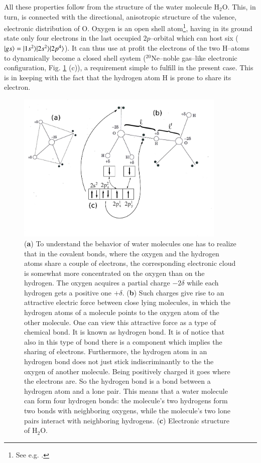 \begin{subappendices}
All these properties follow from the structure of the water molecule H$_2$O. This, in turn, is connected with the directional, anisotropic structure of the valence, electronic distribution of O. Oxygen is an open shell atom\footnote{See e.g. \cite{Greiner:98}.}, having in its ground state only four electrons in the last occupied $2p$--orbital which can host six ($|{gs} \rangle=|{1s^2} \rangle|{2s^2} \rangle|{2p^4} \rangle$). It can thus use at profit the electrons of the two H--atoms to dynamically become a closed shell system ($^{20}$Ne--noble gas--like electronic configuration, Fig. \ref{fig6G5} (c)), a requirement simple to fulfill in the present case. This is in keeping with the fact that the hydrogen atom H is prone to share its electron.
\begin{figure}
\centerline{\includegraphics[width=10cm]{C8/figsC8/fig6G5.pdf}}
\caption{(\textbf{a}) To understand the behavior of water molecules one has to realize that in the covalent bonds, where the oxygen and the hydrogen atoms share a couple of electrons, the corresponding electronic cloud is somewhat more concentrated on the oxygen than on the hydrogen. The oxygen acquires a partial charge $-2\delta$ while each hydrogen gets a positive one $+\delta$. (\textbf{b}) Such charges give rise to an attractive electric force between  close lying molecules, in which the hydrogen atoms of a molecule points to the oxygen atom of the other molecule. One can view this attractive force as a type of chemical bond. It is known as hydrogen bond. It is of notice that also in this type of bond there is a component which implies the sharing of electrons. Furthermore, the hydrogen atom in an hydrogen bond does not just stick indiscriminantly to the the oxygen of another molecule. Being positively charged it goes where the electrons are. So the hydrogen bond is a bond between a hydrogen atom and a lone pair. This means that a water molecule can form four hydrogen bonds: the molecule's two hydrogens form two bonds with neighboring oxygens, while the molecule's two lone pairs interact with neighboring hydrogens. (\textbf{c}) Electronic structure of H$_2$O.}\label{fig6G5}

\end{figure}
\end{subappendices}
